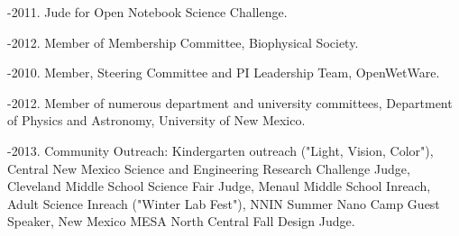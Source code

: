 \documentclass[11pt]{article}
\begin{document}
-2011. Jude for Open Notebook Science Challenge.

-2012. Member of Membership Committee, Biophysical Society.

-2010. Member, Steering Committee and PI Leadership Team, OpenWetWare. 

-2012. Member of numerous department and university committees, Department of Physics and Astronomy, University of New Mexico.

-2013. Community Outreach: Kindergarten outreach ("Light, Vision, Color"), Central New Mexico Science and Engineering Research Challenge Judge, Cleveland Middle School Science Fair Judge, Menaul Middle School Inreach, Adult Science Inreach ("Winter Lab Fest"), NNIN Summer Nano Camp Guest Speaker, New Mexico MESA North Central Fall Design Judge.
\end{document}
